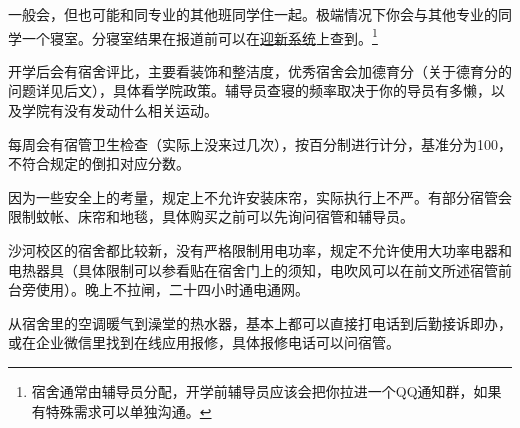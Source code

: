 一般会，但也可能和同专业的其他班同学住一起。极端情况下你会与其他专业的同学一个寝室。分寝室结果在报道前可以在\href{https://welcome.bupt.edu.cn/}{迎新系统}上查到。\footnote{宿舍通常由辅导员分配，开学前辅导员应该会把你拉进一个QQ通知群，如果有特殊需求可以单独沟通。}


开学后会有宿舍评比，主要看装饰和整洁度，优秀宿舍会加德育分（关于德育分的问题详见后文），具体看学院政策。辅导员查寝的频率取决于你的导员有多懒，以及学院有没有发动什么相关运动。

每周会有宿管卫生检查（实际上没来过几次），按百分制进行计分，基准分为100，不符合规定的倒扣对应分数。


因为一些安全上的考量，规定上不允许安装床帘，实际执行上不严。有部分宿管会限制蚊帐、床帘和地毯，具体购买之前可以先询问宿管和辅导员。


沙河校区的宿舍都比较新，没有严格限制用电功率，规定不允许使用大功率电器和电热器具（具体限制可以参看贴在宿舍门上的须知，电吹风可以在前文所述宿管前台旁使用）。晚上不拉闸，二十四小时通电通网。


从宿舍里的空调暖气到澡堂的热水器，基本上都可以直接打电话到后勤接诉即办，或在企业微信里找到在线应用报修，具体报修电话可以问宿管。

